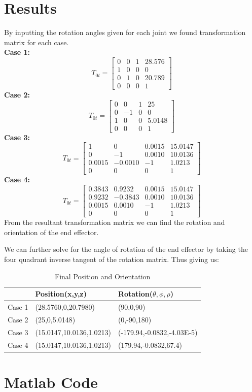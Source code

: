 \documentclass[12pt]{article}
\begin{document}
\section{Results}
By inputting the rotation angles given for each joint we found transformation matrix for each case.\\
\textbf{Case 1:}\\
\[
T_{0t} =
\begin{bmatrix}
         0 & 0 & 1 & 28.576\\
         1 & 0 & 0 & 0\\
         0 & 1 & 0 & 20.789\\
         0 & 0 & 0 & 1
\end{bmatrix}
\]
\textbf{Case 2:}\\
\[
T_{0t} =
\begin{bmatrix}
         0 & 0 & 1 & 25\\
         0 & -1 & 0 & 0\\
         1 & 0 & 0 & 5.0148\\
         0 & 0 & 0 & 1
\end{bmatrix}
\]
\textbf{Case 3:}\\
\[
T_{0t} =
\begin{bmatrix}
         1 & 0 & 0.0015 & 15.0147\\
         0 & -1 & 0.0010 & 10.0136\\
         0.0015 & -0.0010 & -1 & 1.0213\\
         0 & 0 & 0 & 1
\end{bmatrix}
\]
\textbf{Case 4:}\\
\[
T_{0t} =
\begin{bmatrix}
         0.3843 & 0.9232 & 0.0015 & 15.0147\\
         0.9232 & -0.3843 & 0.0010 & 10.0136\\
         0.0015 & 0.0010 & -1 & 1.0213\\
         0 & 0 & 0 & 1
\end{bmatrix}
\]
From the resultant transformation matrix we can find the rotation and orientation of the end effector.

We can further solve for the angle of rotation of the end effector by taking the four quadrant inverse tangent of the rotation matrix. Thus giving us:
\begin{table}[htbp]
  \centering
  \caption{Final Position and Orientation}
    \begin{tabular}{|l|ll|}
    \hline
          & Position(x,y,z) & Rotation($\theta,\phi,\rho$) \\
    \hline
    Case 1 & (28.5760,0,20.7980) & (90,0,90) \\
    Case 2 & (25,0,5.0148) & (0,-90,180) \\
    Case 3 & (15.0147,10.0136,1.0213) & (-179.94,-0.0832,-4.03E-5) \\
    Case 4 & (15.0147,10.0136,1.0213) & (179.94,-0.0832,67.4) \\
    \hline
    \end{tabular}%
\end{table}%
\pagebreak

\appendix
\section{Matlab Code}

\end{document}
